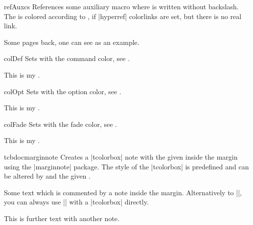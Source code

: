 \begin{docCommand}[doc updated=2020-02-11]{refAuxcs}{}
  References some auxiliary macro  where  is
  written without backslash.
  The  is colored according to ,
  if |hyperref| colorlinks are set, but there is no real link.
\begin{dispExample}
Some pages back, one can see  as an example.
\end{dispExample}
\end{docCommand}


\begin{docCommand}{colDef}{}
Sets  with the command color, see .
\begin{dispExample}
This is my .
\end{dispExample}
\end{docCommand}

\begin{docCommand}{colOpt}{}
  Sets  with the option color, see .
\begin{dispExample}
This is my .
\end{dispExample}
\end{docCommand}

\clearpage

\begin{docCommand}[doc new=2019-09-18]{colFade}{}
  Sets  with the fade color, see .
\begin{dispExample}
This is my .
\end{dispExample}
\end{docCommand}


\begin{docCommand}[doc new=2014-09-19]{tcbdocmarginnote}{}
  Creates a |tcolorbox| note with the given  inside the margin using
  the |marginnote| package. The style of the |tcolorbox| is predefined and can be
  altered by  and the given .
\begin{dispExample}
Some text
which is commented by a note inside the margin.
Alternatively to |\tcbdocmarginnote|, you can always use
|\marginnote| with a |tcolorbox| directly.\par
This is further text%
with another note.
\end{dispExample}
\end{docCommand}

